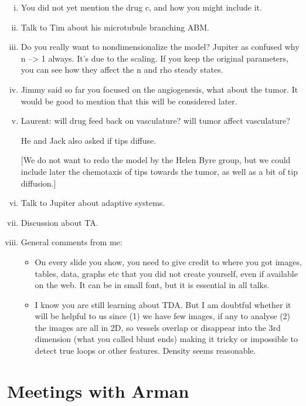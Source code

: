 \begin{itemize}
\begin{enumerate}[(i)]
	\item You did not yet mention the drug c, and how you might include it.
	
	\item Talk to Tim about his microtubule branching ABM.
	
	\item Do you really want to nondimensionalize the model? Jupiter as confused why n --> 1 always. It's due to the scaling. If you keep the original parameters, you can see how they affect the n and rho steady states.
	
	\item Jimmy said so far you focused on the angiogenesis, what about the tumor. It would be good to mention that this will be considered later.
	
	\item Laurent: will drug feed back on vasculature? will tumor affect vasculature?
	
	He and Jack also asked if tips diffuse.
	
	[We do not want to redo the model by the Helen Byre group, but we could include later the chemotaxis of tips towards the tumor, as well as a bit of tip diffusion.]
	
	\item Talk to Jupiter about adaptive systems.
	
	
	\item Discussion about TA.
	
	
	\item General comments from me:
	\begin{itemize}
	
	\item On every slide you show, you need to give credit to where you got images, tables, data, graphs etc that you did not create yourself, even if available on the web. It can be in small font, but it is essential in all talks.
	
	\item I know you are still learning about TDA. But I am doubtful whether it will be helpful to us since (1) we have few images, if any to analyse (2) the images are all in 2D, so vessels overlap or disappear into the 3rd dimension (what you called blunt ends) making it tricky or impossible to detect true loops or other features. Density seems reasonable.
	\end{itemize}
\end{enumerate}
\end{itemize}

\section{Meetings with Arman}